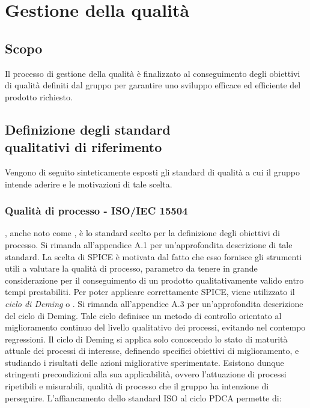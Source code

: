 \documentclass[../NormediProgetto.tex]{subfiles}
\begin{document}

\section{Gestione della qualità}

\subsection{Scopo}
Il processo di gestione della qualità è finalizzato al conseguimento degli obiettivi di qualità definiti dal gruppo per garantire uno sviluppo efficace ed efficiente del prodotto richiesto.


\subsection{Definizione degli standard \\ qualitativi di riferimento}

Vengono di seguito sinteticamente esposti gli standard di qualità a cui il gruppo intende aderire e le motivazioni di tale scelta.   

\subsubsection{Qualità di processo - ISO/IEC 15504}

, anche noto come , è lo standard scelto per la definizione degli obiettivi di processo. Si rimanda all'appendice A.1 per un'approfondita descrizione di tale standard.
La scelta di SPICE è motivata dal fatto che esso fornisce gli strumenti utili a valutare la qualità di processo, parametro da tenere in grande considerazione per il conseguimento di un prodotto qualitativamente valido entro tempi prestabiliti. 
Per poter applicare correttamente SPICE, viene utilizzato il \textit{ciclo di Deming} o . Si rimanda all'appendice A.3 per un'approfondita descrizione del ciclo di Deming. Tale ciclo definisce un metodo di controllo orientato al miglioramento continuo del livello qualitativo dei processi, evitando nel contempo regressioni. Il ciclo di Deming si applica solo conoscendo lo stato di maturità attuale dei processi di interesse, definendo specifici obiettivi di miglioramento, e studiando i risultati delle azioni migliorative sperimentate. Esistono dunque  stringenti precondizioni alla sua applicabilità, ovvero l'attuazione di processi ripetibili e misurabili, qualità di processo che il gruppo ha intenzione di perseguire. L'affiancamento dello standard ISO al ciclo PDCA permette di:
\end{document}

